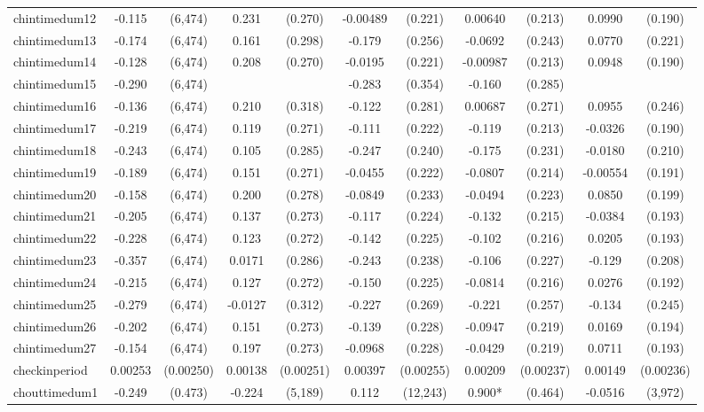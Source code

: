 \documentclass[]{article}
\begin{document}
\begin{tabular}{lcccccccccc}
chintimedum12 & -0.115 & (6,474) & 0.231 & (0.270) & -0.00489 & (0.221) & 0.00640 & (0.213) & 0.0990 & (0.190) \\
chintimedum13 & -0.174 & (6,474) & 0.161 & (0.298) & -0.179 & (0.256) & -0.0692 & (0.243) & 0.0770 & (0.221) \\
chintimedum14 & -0.128 & (6,474) & 0.208 & (0.270) & -0.0195 & (0.221) & -0.00987 & (0.213) & 0.0948 & (0.190) \\
chintimedum15 & -0.290 & (6,474) &  &  & -0.283 & (0.354) & -0.160 & (0.285) &  &  \\
chintimedum16 & -0.136 & (6,474) & 0.210 & (0.318) & -0.122 & (0.281) & 0.00687 & (0.271) & 0.0955 & (0.246) \\
chintimedum17 & -0.219 & (6,474) & 0.119 & (0.271) & -0.111 & (0.222) & -0.119 & (0.213) & -0.0326 & (0.190) \\
chintimedum18 & -0.243 & (6,474) & 0.105 & (0.285) & -0.247 & (0.240) & -0.175 & (0.231) & -0.0180 & (0.210) \\
chintimedum19 & -0.189 & (6,474) & 0.151 & (0.271) & -0.0455 & (0.222) & -0.0807 & (0.214) & -0.00554 & (0.191) \\
chintimedum20 & -0.158 & (6,474) & 0.200 & (0.278) & -0.0849 & (0.233) & -0.0494 & (0.223) & 0.0850 & (0.199) \\
chintimedum21 & -0.205 & (6,474) & 0.137 & (0.273) & -0.117 & (0.224) & -0.132 & (0.215) & -0.0384 & (0.193) \\
chintimedum22 & -0.228 & (6,474) & 0.123 & (0.272) & -0.142 & (0.225) & -0.102 & (0.216) & 0.0205 & (0.193) \\
chintimedum23 & -0.357 & (6,474) & 0.0171 & (0.286) & -0.243 & (0.238) & -0.106 & (0.227) & -0.129 & (0.208) \\
chintimedum24 & -0.215 & (6,474) & 0.127 & (0.272) & -0.150 & (0.225) & -0.0814 & (0.216) & 0.0276 & (0.192) \\
chintimedum25 & -0.279 & (6,474) & -0.0127 & (0.312) & -0.227 & (0.269) & -0.221 & (0.257) & -0.134 & (0.245) \\
chintimedum26 & -0.202 & (6,474) & 0.151 & (0.273) & -0.139 & (0.228) & -0.0947 & (0.219) & 0.0169 & (0.194) \\
chintimedum27 & -0.154 & (6,474) & 0.197 & (0.273) & -0.0968 & (0.228) & -0.0429 & (0.219) & 0.0711 & (0.193) \\
checkinperiod & 0.00253 & (0.00250) & 0.00138 & (0.00251) & 0.00397 & (0.00255) & 0.00209 & (0.00237) & 0.00149 & (0.00236) \\
chouttimedum1 & -0.249 & (0.473) & -0.224 & (5,189) & 0.112 & (12,243) & 0.900* & (0.464) & -0.0516 & (3,972) \\

\end{tabular}
\end{document}
